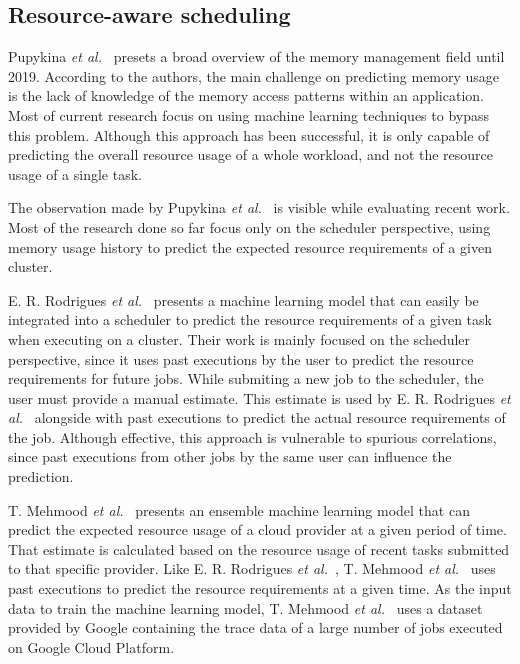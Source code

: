 \subsection{Resource-aware scheduling}
\label{subsec:resource-aware-scheduling}

Pupykina \emph{et al.}~\cite{pupykina2019} presets a broad overview of the memory management field until 2019.
According to the authors, the main challenge on predicting memory usage is the lack of knowledge of the memory access patterns within an application.
Most of current research focus on using machine learning techniques to bypass this problem.
Although this approach has been successful, it is only capable of predicting the overall resource usage of a whole workload, and not the resource usage of a single task.

The observation made by Pupykina \emph{et al.}~\cite{pupykina2019} is visible while evaluating recent work.
Most of the research done so far focus only on the scheduler perspective, using memory usage history to predict the expected resource requirements of a given cluster.

E. R. Rodrigues \emph{et al.}~\cite{rodrigues2016} presents a machine learning model that can easily be integrated into a scheduler to predict the resource requirements of a given task when executing on a cluster.
Their work is mainly focused on the scheduler perspective, since it uses past executions by the user to predict the resource requirements for future jobs.
While submiting a new job to the scheduler, the user must provide a manual estimate.
This estimate is used by E. R. Rodrigues \emph{et al.}~\cite{rodrigues2016} alongside with past executions to predict the actual resource requirements of the job.
Although effective, this approach is vulnerable to spurious correlations, since past executions from other jobs by the same user can influence the prediction.

T. Mehmood \emph{et al.}~\cite{mehmood2018} presents an ensemble machine learning model that can predict the expected resource usage of a cloud provider at a given period of time.
That estimate is calculated based on the resource usage of recent tasks submitted to that specific provider.
Like E. R. Rodrigues \emph{et al.}~\cite{rodrigues2016}, T. Mehmood \emph{et al.}~\cite{mehmood2018} uses past executions to predict the resource requirements at a given time.
As the input data to train the machine learning model, T. Mehmood \emph{et al.}~\cite{mehmood2018} uses a dataset provided by Google containing the trace data of a large number of jobs executed on Google Cloud Platform.

